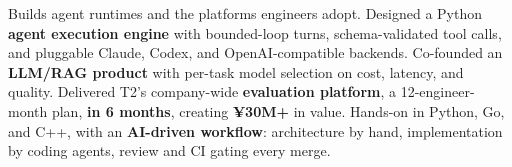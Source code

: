 

\vspace{2mm}

\begin{cvparagraph}

Builds agent runtimes and the platforms engineers adopt. Designed a Python \textbf{agent execution engine} with bounded-loop turns, schema-validated tool calls,
and pluggable Claude, Codex, and OpenAI-compatible backends. Co-founded an \textbf{LLM/RAG product} with per-task model selection on cost, latency, and quality.
Delivered T2's company-wide \textbf{evaluation platform}, a 12-engineer-month plan, \textbf{in 6 months}, creating \textbf{¥30M+} in value.
Hands-on in Python, Go, and C++, with an \textbf{AI-driven workflow}: architecture by hand, implementation by coding agents, review and CI gating every merge.
\end{cvparagraph}
